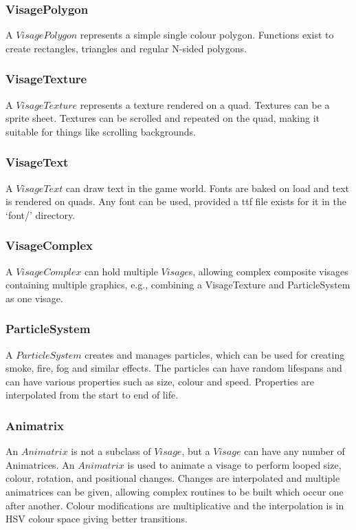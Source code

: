 \documentclass[english]{article}
\begin{document}
\subsubsection{VisagePolygon}
A $VisagePolygon$ represents a simple single colour polygon. Functions exist to create rectangles, triangles and regular N-sided polygons.
\subsubsection{VisageTexture}
A $VisageTexture$ represents a texture rendered on a quad. Textures can be a sprite sheet. Textures can be scrolled and repeated on the quad, making it suitable for things like scrolling backgrounds.
\subsubsection{VisageText}
A $VisageText$ can draw text in the game world. Fonts are baked on load and text is rendered on quads. Any font can be used, provided a ttf file exists for it in the `font/' directory.
\subsubsection{VisageComplex}
A $VisageComplex$ can hold multiple $Visage$s, allowing complex composite visages containing multiple graphics, e.g., combining a VisageTexture and ParticleSystem as one visage.
\subsubsection{ParticleSystem}
A $ParticleSystem$ creates and manages particles, which can be used for creating smoke, fire, fog and similar effects. The particles can have random lifespans and can have various properties such as size, colour and speed. Properties are interpolated from the start to end of life.
\subsubsection{Animatrix}
An $Animatrix$ is not a subclass of $Visage$, but a $Visage$ can have any number of Animatrices. An $Animatrix$ is used to animate a visage to perform looped size, colour, rotation, and positional changes. Changes are interpolated and multiple animatrices can be given, allowing complex routines to be built which occur one after another. Colour modifications are multiplicative and the interpolation is in HSV colour space giving better transitions.
\end{document}
